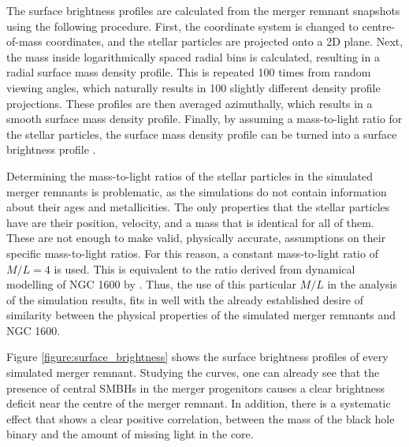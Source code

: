 \documentclass[english, twoside]{HYgradu}
\begin{document}
The surface brightness profiles are calculated from the merger remnant snapshots using the following procedure. First, the coordinate system is changed to centre-of-mass coordinates, and the stellar particles are projected onto a 2D plane. Next, the mass inside logarithmically spaced radial bins is calculated, resulting in a radial surface mass density profile. This is repeated 100 times from random viewing angles, which naturally results in 100 slightly different density profile projections. These profiles are then averaged azimuthally, which results in a smooth surface mass density profile. Finally, by assuming a mass-to-light ratio for the stellar particles, the surface mass density profile can be turned into a surface brightness profile \citep{Rantala2018}. 

Determining the mass-to-light ratios of the stellar particles in the simulated merger remnants is problematic, as the simulations do not contain information about their ages and metallicities. The only properties that the stellar particles have are their position, velocity, and a mass that is identical for all of them. These are not enough to make valid, physically accurate, assumptions on their specific mass-to-light ratios. For this reason, a constant mass-to-light ratio of $M/L = 4$ is used. This is equivalent to the ratio derived from dynamical modelling of NGC 1600 by \cite{Thomas2016}. Thus, the use of this particular $M/L$ in the analysis of the simulation results, fits in well with the already established desire of similarity between the physical properties of the simulated merger remnants and NGC 1600.

Figure \ref{figure:surface_brightness} shows the surface brightness profiles of every simulated merger remnant. Studying the curves, one can already see that the presence of central SMBHs in the merger progenitors causes a clear brightness deficit near the centre of the merger remnant. In addition, there is a systematic effect that shows a clear positive correlation, between the mass of the black hole binary and the amount of missing light in the core.
\end{document}
